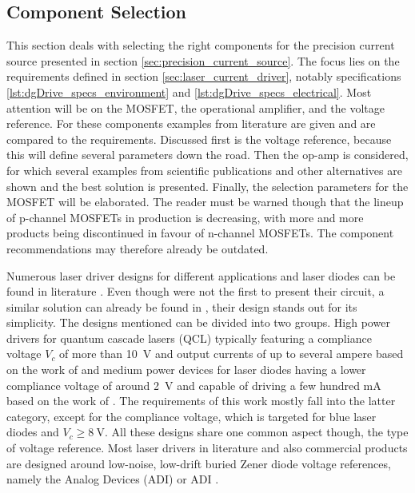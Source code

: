 \subsection{Component Selection}%
\label{sec:component_selection}
This section deals with selecting the right components for the precision current source presented in section \ref{sec:precision_current_source}. The focus lies on the requirements defined in section \ref{sec:laser_current_driver}, notably specifications \ref{lst:dgDrive_specs_environment} and \ref{lst:dgDrive_specs_electrical}. Most attention will be on the MOSFET, the operational amplifier, and the voltage reference. For these components examples from literature are given and are compared to the requirements. Discussed first is the voltage reference, because this will define several parameters down the road. Then the op-amp is considered, for which several examples from scientific publications and other alternatives are shown and the best solution is presented. Finally, the selection parameters for the MOSFET will be elaborated. The reader must be warned though that the lineup of p-channel MOSFETs in production is decreasing, with more and more products being discontinued in favour of n-channel MOSFETs. The component recommendations may therefore already be outdated.

Numerous laser driver designs for different applications and laser diodes can be found in literature \cite{libbrecht_hall, laser_driver_mosfet_noise, laser_driver_digital, laser_driver_digital_update, laser_driver_qcl_space, laser_driver_qcl_taubman, laser_driver_qcl_taubman_multiplexer}. Even though \citeauthor{libbrecht_hall} \cite{libbrecht_hall} were not the first to present their circuit, a similar solution can already be found in \cite{laser_driver_old}, their design stands out for its simplicity. The designs mentioned can be divided into two groups. High power drivers for quantum cascade lasers (QCL) typically featuring a compliance voltage $V_c$ of more than \qty{10}{\V} and output currents of up to several ampere based on the work of \citeauthor{laser_driver_qcl_taubman} \cite{laser_driver_qcl_taubman} and medium power devices for laser diodes having a lower compliance voltage of around \qty{2}{\V} and capable of driving a few hundred \unit{\mA} based on the work of \citeauthor{libbrecht_hall} \cite{libbrecht_hall}. The requirements of this work mostly fall into the latter category, except for the compliance voltage, which is targeted for blue laser diodes and $V_c \ge \qty{8}{\V}$. All these designs share one common aspect though, the type of voltage reference. Most laser drivers in literature and also commercial products are designed around low-noise, low-drift buried Zener diode voltage references, namely the Analog Devices (ADI)  \cite{datasheet_LM399} or ADI  \cite{datasheet_LTZ1000}.

